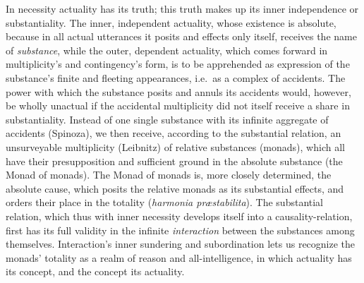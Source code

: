 \documentclass[12pt]{book}
\begin{document}
In necessity actuality has its truth; this truth makes up its inner
independence or substantiality. The inner, independent actuality, whose
existence is absolute, because in all actual utterances it posits and
effects only itself, receives the name of \emph{substance}, while the outer,
dependent actuality, which comes forward in multiplicity's and contingency's
form, is to be apprehended as expression of the substance's finite and
fleeting appearances, i.e.\ as a complex of accidents. The power with which
the substance posits and annuls its accidents would, however, be wholly
unactual if the accidental multiplicity did not itself receive a share in
substantiality. Instead of one single substance with its infinite aggregate
of accidents (Spinoza), we then receive, according to the substantial
relation, an unsurveyable multiplicity (Leibnitz) of relative substances
(monads), which all have their presupposition and sufficient ground in the
absolute substance (the Monad of monads). The Monad of monads is, more
closely determined, the absolute cause, which posits the relative monads as
its substantial effects, and orders their place in the totality
(\textit{harmonia præstabilita}). The substantial relation, which thus with
inner necessity develops itself into a causality-relation, first has its
full validity in the infinite \emph{interaction} between the substances
among themselves. Interaction's inner sundering and subordination lets us
recognize the monads' totality as a realm of reason and all-intelligence,
in which actuality has its concept, and the concept its actuality.
\end{document}
